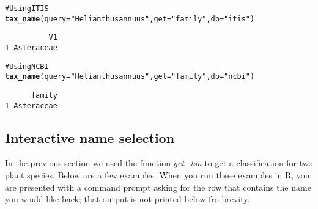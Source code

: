 \documentclass[10pt]{article}\usepackage{graphicx, color}
\makeatletter
\newcommand{\hlfunctioncall}[1]{\textcolor[rgb]{0.501960784313725,0,0.329411764705882}{\textbf{#1}}}%
\newcommand{\hlstring}[1]{\textcolor[rgb]{0.6,0.6,1}{#1}}%
\newcommand{\hlcomment}[1]{\textcolor[rgb]{0.180392156862745,0.6,0.341176470588235}{#1}}%
\newenvironment{kframe}{%
 \def\at@end@of@kframe{}%
 \ifinner\ifhmode%
  \def\at@end@of@kframe{\end{minipage}}%
  \begin{minipage}{\columnwidth}%
 \fi\fi%
 \def\FrameCommand##1{\hskip\@totalleftmargin \hskip-\fboxsep
 \colorbox{shadecolor}{##1}\hskip-\fboxsep
     \hskip-\linewidth \hskip-\@totalleftmargin \hskip\columnwidth}%
 \MakeFramed {\advance\hsize-\width
   \@totalleftmargin\z@ \linewidth\hsize
   \@setminipage}}%
 {\par\unskip\endMakeFramed%
 \at@end@of@kframe}
\newenvironment{knitrout}{}{} %
\makeatother
\begin{document}
\begin{knitrout}
\color{fgcolor}\begin{kframe}
\begin{alltt}
\hlcomment{# Using ITIS}
\hlfunctioncall{tax_name}(query = \hlstring{"Helianthus annuus"}, get = \hlstring{"family"}, db = \hlstring{"itis"})
\end{alltt}
\begin{verbatim}
          V1
1 Asteraceae
\end{verbatim}
\begin{alltt}

\hlcomment{# Using NCBI}
\hlfunctioncall{tax_name}(query = \hlstring{"Helianthus annuus"}, get = \hlstring{"family"}, db = \hlstring{"ncbi"})
\end{alltt}
\begin{verbatim}
      family
1 Asteraceae
\end{verbatim}
\end{kframe}
\end{knitrout}


\subsection*{Interactive name selection}
In the previous section we used the function \emph{get\_tsn} to get a classification for two plant species. Below are a few examples. When you run these examples in R, you are presented with a command prompt asking for the row that contains the name you would like back; that output is not printed below fro brevity.
\end{document}
